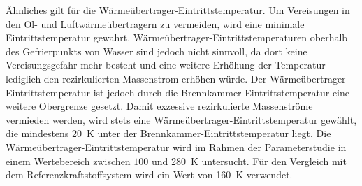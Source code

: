 Ähnliches gilt für die Wärmeübertrager-Eintrittstemperatur. Um Vereisungen in den Öl- und Luftwärmeübertragern zu vermeiden, wird eine minimale Eintrittstemperatur gewahrt. Wärmeübertrager-Eintrittstemperaturen oberhalb des Gefrierpunkts von Wasser sind jedoch nicht sinnvoll, da dort keine Vereisungsgefahr mehr besteht und eine weitere Erhöhung der Temperatur lediglich den rezirkulierten Massenstrom erhöhen würde. Der Wärmeübertrager-Eintrittstemperatur ist jedoch durch die Brennkammer-Eintrittstemperatur eine weitere Obergrenze gesetzt. Damit exzessive rezirkulierte Massenströme vermieden werden, wird stets eine Wärmeübertrager-Eintrittstemperatur gewählt, die mindestens \SI{20}{\K} unter der Brennkammer-Eintrittstemperatur liegt. Die Wärmeübertrager-Eintrittstemperatur wird im Rahmen der Parameterstudie in einem Wertebereich zwischen $100$ und \SI{280}{\K} untersucht. Für den Vergleich mit dem Referenzkraftstoffsystem wird ein Wert von \SI{160}{\K} verwendet.

